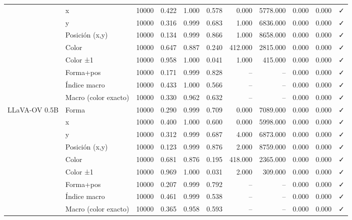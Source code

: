 \begin{tabular}{llrrrrrrrrl}
 & x & 10000 & 0.422 & 1.000 & 0.578 & 0.000 & 5778.000 & 0.000 & 0.000 & ✓ \\
 & y & 10000 & 0.316 & 0.999 & 0.683 & 1.000 & 6836.000 & 0.000 & 0.000 & ✓ \\
 & Posición (x,y) & 10000 & 0.134 & 0.999 & 0.866 & 1.000 & 8658.000 & 0.000 & 0.000 & ✓ \\
 & Color & 10000 & 0.647 & 0.887 & 0.240 & 412.000 & 2815.000 & 0.000 & 0.000 & ✓ \\
 & Color ±1 & 10000 & 0.958 & 1.000 & 0.041 & 1.000 & 415.000 & 0.000 & 0.000 & ✓ \\
 & Forma+pos & 10000 & 0.171 & 0.999 & 0.828 & -- & -- & 0.000 & 0.000 & ✓ \\
 & Índice macro & 10000 & 0.433 & 1.000 & 0.566 & -- & -- & 0.000 & 0.000 & ✓ \\
 & Macro (color exacto) & 10000 & 0.330 & 0.962 & 0.632 & -- & -- & 0.000 & 0.000 & ✓ \\
\cline{1-11}
\multirow[t]{9}{*}{LLaVA-OV 0.5B} & Forma & 10000 & 0.290 & 0.999 & 0.709 & 0.000 & 7089.000 & 0.000 & 0.000 & ✓ \\
 & x & 10000 & 0.400 & 1.000 & 0.600 & 0.000 & 5998.000 & 0.000 & 0.000 & ✓ \\
 & y & 10000 & 0.312 & 0.999 & 0.687 & 4.000 & 6873.000 & 0.000 & 0.000 & ✓ \\
 & Posición (x,y) & 10000 & 0.123 & 0.999 & 0.876 & 2.000 & 8759.000 & 0.000 & 0.000 & ✓ \\
 & Color & 10000 & 0.681 & 0.876 & 0.195 & 418.000 & 2365.000 & 0.000 & 0.000 & ✓ \\
 & Color ±1 & 10000 & 0.969 & 1.000 & 0.031 & 2.000 & 309.000 & 0.000 & 0.000 & ✓ \\
 & Forma+pos & 10000 & 0.207 & 0.999 & 0.792 & -- & -- & 0.000 & 0.000 & ✓ \\
 & Índice macro & 10000 & 0.461 & 0.999 & 0.538 & -- & -- & 0.000 & 0.000 & ✓ \\
 & Macro (color exacto) & 10000 & 0.365 & 0.958 & 0.593 & -- & -- & 0.000 & 0.000 & ✓ \\
\cline{1-11}
\bottomrule
\end{tabular}
